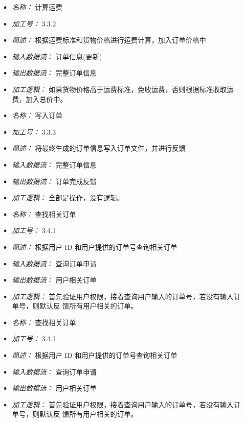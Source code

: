 \begin{itemize}
\item \textit{名称： }计算运费
\item \textit{加工号： }3.3.2
\item \textit{简述： }根据运费标准和货物价格进行运费计算，加入订单价格中 
\item \textit{输入数据流： }订单信息(更新)
\item \textit{输出数据流： }完整订单信息 
\item \textit{加工逻辑： }如果货物价格高于运费标准，免收运费，否则根据标准收取运费，加入总价中。

\end{itemize}


\vspace{-1mm}


\begin{itemize}
\item \textit{名称： }写入订单
\item \textit{加工号： }3.3.3 
\item \textit{简述： }将最终生成的订单信息写入订单文件，并进行反馈 
\item \textit{输入数据流： }完整订单信息
\item \textit{输出数据流： }订单完成反馈
\item \textit{加工逻辑： }全部是操作，没有逻辑。

\end{itemize}


\vspace{-1mm}


\begin{itemize}
\item \textit{名称： }查找相关订单
\item \textit{加工号： }3.4.1
\item \textit{简述： }根据用户 ID 和用户提供的订单号查询相关订单
\item \textit{输入数据流： }查询订单申请
\item \textit{输出数据流： }用户相关订单 
\item \textit{加工逻辑： }首先验证用户权限，接着查询用户输入的订单号，若没有输入订单号，则默认反 馈所有用户相关的订单。

\end{itemize}


\vspace{-1mm}


\begin{itemize}
\item \textit{名称： }查找相关订单
\item \textit{加工号： }3.4.1
\item \textit{简述： }根据用户 ID 和用户提供的订单号查询相关订单
\item \textit{输入数据流： }查询订单申请
\item \textit{输出数据流： }用户相关订单 
\item \textit{加工逻辑： }首先验证用户权限，接着查询用户输入的订单号，若没有输入订单号，则默认反 馈所有用户相关的订单。

\end{itemize}


